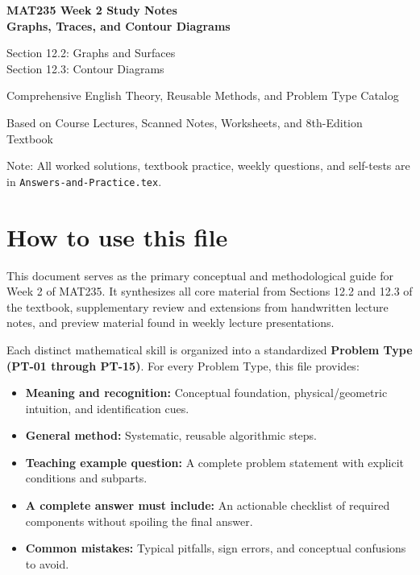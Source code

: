 \documentclass[11pt,letterpaper]{article}
\begin{document}
\hypersetup{pageanchor=false}

\begin{titlepage}
\centering
\vspace*{1.2in}
{\Huge\bfseries MAT235 Week 2 Study Notes\\[12pt] Graphs, Traces, and Contour Diagrams\par}
\vspace{18pt}
{\LARGE Section 12.2: Graphs and Surfaces\\Section 12.3: Contour Diagrams\par}
\vspace{22pt}
{\large Comprehensive English Theory, Reusable Methods, and Problem Type Catalog\par}
\vfill
{\large Based on Course Lectures, Scanned Notes, Worksheets, and 8th-Edition Textbook\par}
\vspace{10pt}
{\small Note: All worked solutions, textbook practice, weekly questions, and self-tests are in \texttt{Answers-and-Practice.tex}.\par}
\end{titlepage}

\hypersetup{pageanchor=true}
\tableofcontents
\clearpage
{}

\section*{How to use this file}
This document serves as the primary conceptual and methodological guide for Week 2 of MAT235. It synthesizes all core material from Sections 12.2 and 12.3 of the textbook, supplementary review and extensions from handwritten lecture notes, and preview material found in weekly lecture presentations.

Each distinct mathematical skill is organized into a standardized \textbf{Problem Type (PT-01 through PT-15)}. For every Problem Type, this file provides:
\begin{itemize}[leftmargin=*,nosep]
    \item \textbf{Meaning and recognition:} Conceptual foundation, physical/geometric intuition, and identification cues.
    \item \textbf{General method:} Systematic, reusable algorithmic steps.
    \item \textbf{Teaching example question:} A complete problem statement with explicit conditions and subparts.
    \item \textbf{A complete answer must include:} An actionable checklist of required components without spoiling the final answer.
    \item \textbf{Common mistakes:} Typical pitfalls, sign errors, and conceptual confusions to avoid.
\end{itemize}
\end{document}
